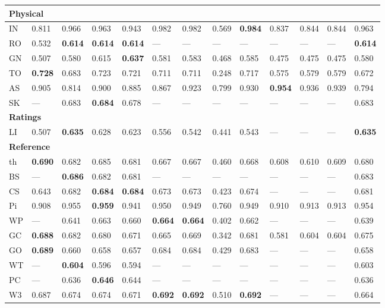 \begin{longtable}{ lllllllllllll }
\hline
\multicolumn{13}{|l|}{\textbf{Physical}} \\
\hline
\textsf{IN}                   & 0.811 & 0.966 & 0.963 & 0.943 & 0.982 & 0.982 & 0.569 & \bf{0.984} & 0.837 & 0.844 & 0.844 & 0.963 \\
\textsf{RO}                   & 0.532 & \bf{0.614} & \bf{0.614} & \bf{0.614} & --- & --- & --- & --- & --- & --- & --- & \bf{0.614} \\
\textsf{GN}                   & 0.507 & 0.580 & 0.615 & \bf{0.637} & 0.581 & 0.583 & 0.468 & 0.585 & 0.475 & 0.475 & 0.475 & 0.580 \\
\textsf{TO}                   & \bf{0.728} & 0.683 & 0.723 & 0.721 & 0.711 & 0.711 & 0.248 & 0.717 & 0.575 & 0.579 & 0.579 & 0.672 \\
\textsf{AS}                   & 0.905 & 0.814 & 0.900 & 0.885 & 0.867 & 0.923 & 0.799 & 0.930 & \bf{0.954} & 0.936 & 0.939 & 0.794 \\
\textsf{SK}                   & --- & 0.683 & \bf{0.684} & 0.678 & --- & --- & --- & --- & --- & --- & --- & 0.683 \\

\hline
\multicolumn{13}{|l|}{\textbf{Ratings}} \\
\hline
\textsf{LI}                   & 0.507 & \bf{0.635} & 0.628 & 0.623 & 0.556 & 0.542 & 0.441 & 0.543 & --- & --- & --- & \bf{0.635} \\

\hline
\multicolumn{13}{|l|}{\textbf{Reference}} \\
\hline
\textsf{th}                   & \bf{0.690} & 0.682 & 0.685 & 0.681 & 0.667 & 0.667 & 0.460 & 0.668 & 0.608 & 0.610 & 0.609 & 0.680 \\
\textsf{BS}                   & --- & \bf{0.686} & 0.682 & 0.681 & --- & --- & --- & --- & --- & --- & --- & 0.683 \\
\textsf{CS}                   & 0.643 & 0.682 & \bf{0.684} & \bf{0.684} & 0.673 & 0.673 & 0.423 & 0.674 & --- & --- & --- & 0.681 \\
\textsf{Pi}                   & 0.908 & 0.955 & \bf{0.959} & 0.941 & 0.950 & 0.949 & 0.760 & 0.949 & 0.910 & 0.913 & 0.913 & 0.954 \\
\textsf{WP}                   & --- & 0.641 & 0.663 & 0.660 & \bf{0.664} & \bf{0.664} & 0.402 & 0.662 & --- & --- & --- & 0.639 \\
\textsf{GC}                   & \bf{0.688} & 0.682 & 0.680 & 0.671 & 0.665 & 0.669 & 0.342 & 0.681 & 0.581 & 0.604 & 0.604 & 0.675 \\
\textsf{GO}                   & \bf{0.689} & 0.660 & 0.658 & 0.657 & 0.684 & 0.684 & 0.429 & 0.683 & --- & --- & --- & 0.658 \\
\textsf{WT}                   & --- & \bf{0.604} & 0.596 & 0.594 & --- & --- & --- & --- & --- & --- & --- & 0.603 \\
\textsf{PC}                   & --- & 0.636 & \bf{0.646} & 0.644 & --- & --- & --- & --- & --- & --- & --- & 0.636 \\
\textsf{W3}                   & 0.687 & 0.674 & 0.674 & 0.671 & \bf{0.692} & \bf{0.692} & 0.510 & \bf{0.692} & --- & --- & --- & 0.664 \\


\end{longtable}
